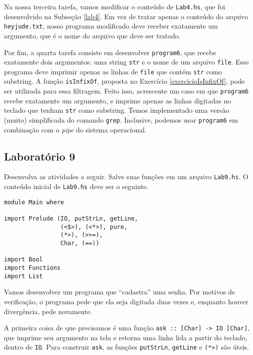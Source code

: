\documentclass[a4paper]{article}
\begin{document}
Na nossa terceira tarefa, vamos modificar o conteúdo de \texttt{Lab4.hs}, que foi desenvolvido na Subseção \ref{lab4}.
Em vez de tratar apenas o conteúdo do arquivo \texttt{heyjude.txt}, nosso programa modificado deve receber exatamente um argumento, que é o nome do arquivo que deve ser tratado.

Por fim, a quarta tarefa consiste em desenvolver \texttt{program6}, que recebe exatamente dois argumentos: uma string \texttt{str} e o nome de um arquivo \texttt{file}.
Esse programa deve imprimir apenas as linhas de \texttt{file} que contém \texttt{str} como substring.
A função \texttt{isInfixOf}, proposta no Exercício \ref{exercicioIsInfixOf}, pode ser utilizada para essa filtragem.
Feito isso, acrescente um caso em que \texttt{program6} recebe exatamente um argumento, e imprime apenas as linhas digitadas no teclado que tenham \texttt{str} como substring.
Temos implementado uma versão (muito) simplificada do comando \texttt{grep}.
Inclusive, podemos usar \texttt{program6} em combinação com o \emph{pipe} do sistema operacional.

\subsection{Laboratório 9}

Desenvolva as atividades a seguir.
Salve suas funções em um arquivo \texttt{Lab9.hs}.
O conteúdo inicial de \texttt{Lab9.hs} deve ser o seguinte.

\begin{verbatim}
module Main where

import Prelude (IO, putStrLn, getLine,
                (<$>), (<*>), pure,
                (*>), (>>=),
                Char, (==))

import Bool
import Functions
import List
\end{verbatim}

Vamos desenvolver um programa que ``cadastra'' uma senha.
Por motivos de verificação, o programa pede que ela seja digitada duas vezes e, enquanto houver divergência, pede novamente.

A primeira coisa de que precisamos é uma função \texttt{ask :: [Char] -> IO [Char]}, que imprime seu argumento na tela e retorna uma linha lida a partir do teclado, dentro de \texttt{IO}.
Para construir \texttt{ask}, as funções \texttt{putStrLn}, \texttt{getLine} e \texttt{(*>)} são úteis.
\end{document}
